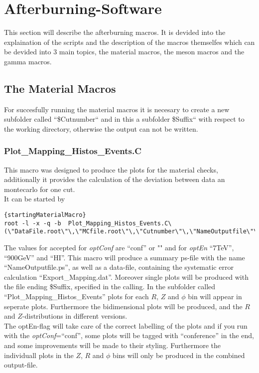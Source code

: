 \chapter{Afterburning-Software}
	This section will describe the afterburning macros. It is devided into the explaination of the scripts and the description of the macros themselfes which can be devided into 3 main topics, the material macros, the meson macros and the gamma macros.

	\section{The Material Macros}
		For succesfully running the material macros it is necesary to create a new subfolder called ``\$Cutnumber`` and in this a subfolder \$Suffix`` with respect to the working directory, otherwise the output can not be written.
		\subsection{Plot\_Mapping\_Histos\_Events.C}
		This macro was designed to produce the plots for the material checks, additionally it provides the calculation of the deviation between data an montecarlo for one cut. \\
		It can be started by
		\begin{lstlisting}[]{startingMaterialMacro}	
root -l -x -q -b  Plot_Mapping_Histos_Events.C\(\"DataFile.root\"\,\"MCfile.root\"\,\"Cutnumber\"\,\"NameOutputfile\"\,\"Suffix\"\,\"optConf\"\,\"optEn\"\)
		\end{lstlisting}
		The values for accepted for \textit{optConf} are ``conf'' or "" and for \textit{optEn} ``7TeV'', ``900GeV'' and ``HI''. This macro will produce a summary ps-file with the name ``NameOutputfile.ps'', as well as a data-file, containing the systematic error calculation ``Export\_Mapping.dat''. Moreover single plots will be produced with the file ending \$Suffix, specified in the calling.  In the subfolder called ``Plot\_Mapping\_Histos\_Events'' plots for each $R$, $Z$ and $\phi$ bin will appear in seperate plots. Furthermore the bidimensional plots will be produced, and the $R$ and $Z$-distributions in different versions.\\
		The optEn-flag will take care of the correct labelling of the plots and if you run with the \textit{optConf}=``conf'', some plots will be tagged with ``conference'' in the end, and some improvements will be made to their styling. Furthermore the individuall plots in the $Z$, $R$ and $\phi$ bins will only be produced in the combined output-file.
